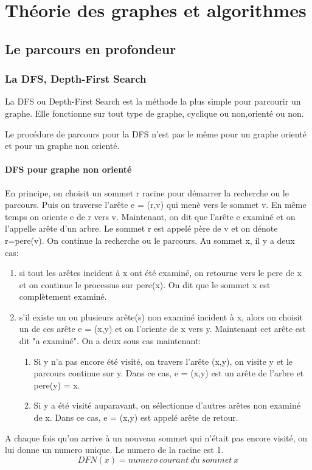 \chapter{Théorie des graphes et algorithmes}
\section{Le parcours en profondeur}
\subsection{La DFS, Depth-First Search}
La DFS ou Depth-First Search  est la méthode la plus simple pour parcourir un graphe. Elle fonctionne sur tout type de graphe, cyclique ou non,orienté ou non.

Le procédure de parcours pour la DFS n'est pas le même pour un graphe orienté et pour un graphe non orienté.

\subsubsection{DFS pour graphe non orienté}
En principe, on choisit un sommet r racine pour démarrer la recherche ou le parcours. Puis on traverse l'arête e = (r,v) qui menè vers le sommet v. En même temps on oriente e de r vers v. Maintenant, on dit que l'arête e examiné et on l'appelle arête d'un arbre.
Le sommet r est appelé père de v et on dénote r=pere(v). On continue la recherche ou le parcours.
Au sommet x, il y a deux cas:
\begin{enumerate}
	\item si tout les arêtes incident à x ont été examiné, on retourne vers le pere de x et on continue le processus sur pere(x). On dit que le sommet x est complètement examiné.
	\item s'il existe un ou plusieurs arête(s) non examiné incident à x, alors on choisit un de ces arête e = (x,y) et on l'oriente de x vers y. Maintenant cet arête est dit "a examiné". On a deux sous cas maintenant:
	\begin{enumerate}
		\item Si y n'a pas encore été visité, on travers l'arête (x,y), on visite y et le parcours continue sur y. Dans ce cas, e = (x,y) est un arête de l'arbre et pere(y) = x.
		\item Si y a été visité auparavant, on sélectionne d'autres arêtes non examiné de x. Dans ce cas, e = (x,y) est appelé arête de retour.  
	\end{enumerate} 
\end{enumerate}
A chaque fois qu'on arrive à un nouveau sommet qui n'était pas encore visité, on lui donne un numero unique. Le numero de la racine est 1.
$$DFN(x)=numero\ courant\ du\ sommet\ x$$ 

